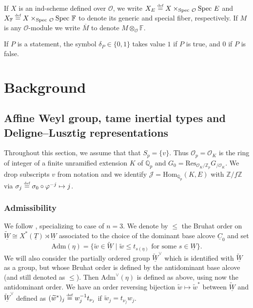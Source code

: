 \documentclass[oneside,a4paper,english, 11pt]{amsart}
\theoremstyle{plain}
\theoremstyle{plain}
\theoremstyle{plain}
\theoremstyle{plain}
\theoremstyle{plain}
\theoremstyle{plain}
\theoremstyle{definition}
\theoremstyle{definition}
\theoremstyle{definition}
\theoremstyle{remark}
\numberwithin{equation}{section}
\newcommand{\Z}{\mathbb{Z}}
\newcommand{\Qp}{\mathbb{Q}_p}
\newcommand{\F}{\mathbb{F}}
\newcommand{\cJ}{\mathcal{J}}
\newcommand{\cO}{\mathcal{O}}
\newcommand{\phz}{\varphi}
\newcommand{\Hom}{\mathrm{Hom}}
\newcommand{\Res}{\mathrm{Res}}
\newcommand{\Spec}{\mathrm{Spec}\ }
\newcommand{\Adm}{\mathrm{Adm}}
\newcommand{\un}[1]{\underline{#1}}
\newcommand{\tld}[1]{\widetilde{#1}}
\newcommand{\defeq}{\stackrel{\textrm{\tiny{def}}}{=}}
\newcommand{\ovl}[1]{\overline{#1}}
\begin{document}
If $X$ is an ind-scheme defined over $\cO$, we write $X_E\defeq X\times_{\Spec\cO} \Spec E$ and $X_{\F}\defeq X\times_{\Spec \cO}\Spec \F$ to denote its generic and special fiber, respectively. 
If $M$ is any $\cO$-module we write $\ovl{M}$ to denote $M\otimes_{\cO}\F$.
%
%



If $P$ is a statement, the symbol $\delta_P\in \{0,1\}$ takes value $1$ if $P$ is true, and $0$ if $P$ is false. 



%


\section{Background}
\label{sec:background}
%


\subsection{Affine Weyl group, tame inertial types and Deligne--Lusztig representations}
\label{subsub:TIT:DL}

Throughout this section, we assume that that $S_p=\{v\}$. 
Thus $\cO_p=\cO_K$ is the ring of integer of a finite unramified extension $K$ of $\Qp$ and $G_0 = \Res_{\cO_K/\Z_p} G_{/\cO_K}$.
We drop subscripts $v$ from notation and we identify $\cJ=\Hom_{\Qp}(K,E)$ with $\Z/f\Z$ via $\sigma_{j} \defeq \sigma_0 \circ \phz^{-j} \mapsto j$.



%
\subsubsection{Admissibility}
We follow \cite[\S 2.1--\S 2.4]{MLM}, specializing to case of $n=3$.
We denote by $\leq$ the Bruhat order on $\un{\tld{W}}\cong X^*(\un{T})\rtimes \un{W}$ associated to the choice of the dominant base alcove $\un{C}_0$ and set 
\[
\Adm (\eta) = \{ \tld{w} \in \un{\tld{W}} \mid \tld{w} \leq t_{s(\eta)} \text{ for some } s \in \un{W} \}. 
\] 
%
We will also consider the partially ordered group $\un{\tld{W}}^\vee$ which is identified with $\tld{\un{W}}$ as a group, but whose Bruhat order is defined by the antidominant base alcove (and still denoted as $\leq$).
Then $\Adm^\vee(\eta)$ is defined as above, using now the antidominant order.
We have an order reversing bijection $\tld{w}\mapsto \tld{w}^*$ between $\tld{\un{W}}$ and $\tld{\un{W}}^\vee$  defined as $(\tld{w}^*)_j\defeq w_j^{-1}t_{\nu_j}$ if $\tld{w}_j=t_{\nu_j}w_j$.
\end{document}
